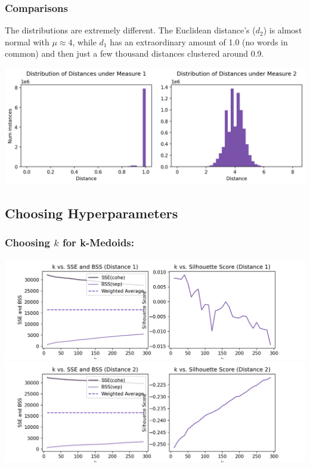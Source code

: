 \documentclass[fleqn]{article}
\begin{document}
\subsubsection{Comparisons}
The distributions are extremely different.  The Euclidean distance's ($d_{2}$) is almost normal with $\mu \approx 4$, while $d_{1}$ has an extraordinary amount of 1.0 (no words in common) and then just a few thousand distances clustered around 0.9.
\begin{center}
	\includegraphics[scale=0.50]{images/distance_distributions_horizontal.png}
\end{center}

\subsection{Choosing Hyperparameters}
\subsubsection{Choosing $k$ for k-Medoids:}
\begin{center}
	\includegraphics[scale=0.40]{images/d1_ks.png}
	\includegraphics[scale=0.40]{images/d2_ks.png}
\end{center}
\end{document}
